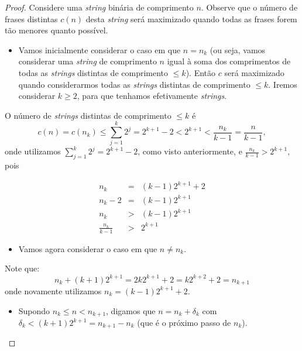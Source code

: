 \begin{frame}[allowframebreaks]
\begin{proof}
	\proofbreak
	Considere uma \textit{string} binária de comprimento $n$. Observe que o número de frases
	distintas $c(n)$ desta \textit{string} será maximizado quando todas as frases forem tão menores quanto possível.

	\begin{itemize}
	\item Vamos inicialmente considerar o caso em que $n = n_k$ (ou seja, vamos considerar uma
	\textit{string} de comprimento $n$ igual à soma dos comprimentos de todas as \textit{strings}
	distintas de comprimento $\leq k$). Então $c$ será maximizado quando considerarmos todas
	as \textit{strings} distintas de comprimento $\leq k$. Iremos considerar $k \geq 2$,
	para que tenhamos efetivamente \textit{strings}.
	\end{itemize}

	\proofbreak
	O número de \textit{strings} distintas de comprimento $\leq k$ é
	\begin{equation}
	c(n) = c(n_k) \leq \sum_{j=1}^k 2^j = 2^{k+1} - 2 < 2^{k+1} < \frac{n_k}{k-1} = \frac{n}{k-1} ,
	\end{equation}
	onde utilizamos $\sum_{j=1}^k 2^j = 2^{k+1} - 2$, como visto anteriormente, e $\frac{n_k}{k-1} > 2^{k+1}$,
	pois

	\proofbreak

	\begin{eqnarray}
	n_k &=& (k-1) 2^{k+1} + 2 \nonumber \\
	n_k - 2 &=& (k-1) 2^{k+1} \nonumber \\
	n_k &>& (k-1) 2^{k+1} \nonumber \\
	\frac{n_k}{k-1} &>& 2^{k+1} 
	\end{eqnarray}

	\proofbreak

	\begin{itemize}
        \item Vamos agora considerar o caso em que $n \neq n_k$.
	\end{itemize}

	Note que:
	\begin{equation}
	n_k + (k+1) 2^{k+1} = 2k 2^{k+1} + 2 = k 2^{k+2} + 2 = n_{k+1}
	\end{equation}
	onde novamente utilizamos $n_k = (k-1) 2^{k+1} + 2$.

	\proofbreak
	\begin{itemize}
        \item Supondo $n_k \leq n < n_{k+1}$, digamos que $n = n_k + \delta_k$ com
		$\delta_k < (k+1)2^{k+1} = n_{k+1} - n_k$ (que é o próximo passo de $n_k$).


\end{itemize}
\end{proof}
\end{frame}
